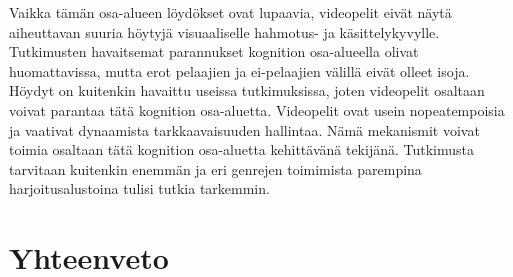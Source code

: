 \documentclass[utf8,bachelor]{gradu3}
\begin{document}
Vaikka tämän osa-alueen löydökset ovat lupaavia, videopelit eivät näytä aiheuttavan suuria höytyjä visuaaliselle hahmotus- ja käsittelykyvylle. Tutkimusten havaitsemat parannukset kognition osa-alueella olivat huomattavissa, mutta erot pelaajien ja ei-pelaajien välillä eivät olleet isoja. Höydyt on kuitenkin havaittu useissa tutkimuksissa, joten videopelit osaltaan voivat parantaa tätä kognition osa-aluetta. Videopelit ovat usein nopeatempoisia ja vaativat dynaamista tarkkaavaisuuden hallintaa. Nämä mekanismit voivat toimia osaltaan tätä kognition osa-aluetta kehittävänä tekijänä. Tutkimusta tarvitaan kuitenkin enemmän ja eri genrejen toimimista parempina harjoitusalustoina tulisi tutkia tarkemmin.  

\chapter{Yhteenveto}

\printbibliography
\end{document}
